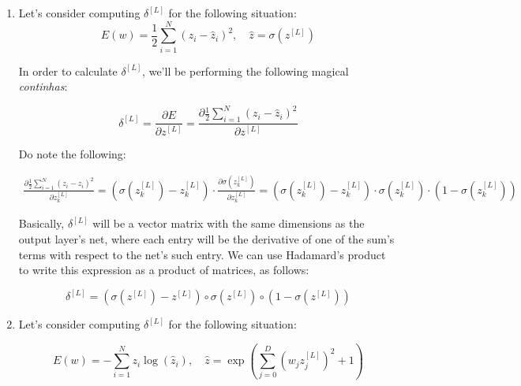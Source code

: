 \documentclass[12pt]{article}
\begin{document}
\begin{enumerate}
  \item{
              Let's consider computing $\delta^{[L]}$ for the following situation:
              \begin{equation*}
                E(w) = \frac{1}{2} \sum_{i=1}^N (z_i - \hat{z}_i)^2, \quad \hat{z} = \sigma(z^{[L]})
              \end{equation*}

              In order to calculate $\delta^{[L]}$, we'll be performing the
              following magical \textit{continhas}:

              $$
                \delta^{[L]} = \frac{\partial E}{\partial z^{[L]}}
                = \frac{\partial \frac{1}{2} \sum_{i=1}^N (z_i - \hat{z}_i)^2}{\partial z^{[L]}}
              $$

              Do note the following:

              \begin{align*}
                \frac{\partial \frac{1}{2} \sum_{i=1}^N (z_i - \hat{z}_i)^2}{\partial z_k^{[L]}}
                = \left(\sigma(z_k^{[L]}) - z_k^{[L]}\right) \cdot \frac{\partial \sigma(z_k^{[L]})}{\partial z_k^{[L]}}
                = \left(\sigma(z_k^{[L]}) - z_k^{[L]}\right) \cdot \sigma(z_k^{[L]}) \cdot (1 - \sigma(z_k^{[L]}))
              \end{align*}

              Basically, $\delta^{[L]}$ will be a vector matrix with the same dimensions
              as the output layer's net, where each entry will be the derivative of
              one of the sum's terms with respect to the net's such entry.
              We can use Hadamard's product to write this expression as a product
              of matrices, as follows:

              \begin{equation*}
                \delta^{[L]} = \left(\sigma(z^{[L]}) - z^{[L]}\right) \circ \sigma(z^{[L]}) \circ (1 - \sigma(z^{[L]}))
              \end{equation*}
        }
  \item{
              Let's consider computing $\delta^{[L]}$ for the following situation:

              \begin{equation*}
                E(w) = - \sum_{i=1}^N z_i \log(\hat{z}_i), \quad \hat{z} = \exp\left(\sum_{j=0}^D (w_j z_j^{[L]})^2 + 1\right)
              \end{equation*}

}
\end{enumerate}
\end{document}
